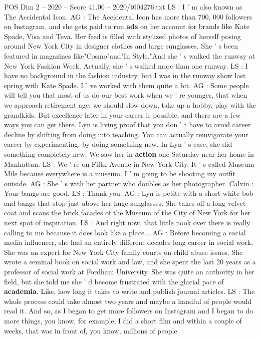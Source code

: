 \begin{textsample}{POS Dim 2 – 2020 – Score 41.00 – 2020/t004276.txt}
LS : I ' m also known as The Accidental Icon.
AG : The Accidental Icon has more than 700, 000 followers on Instagram, and she gets paid to run \textbf{ads} on her account for brands like Kate Spade, Visa and Teva.
Her feed is filled with stylized photos of herself posing around New York City in designer clothes and large sunglasses.
She ' s been featured in magazines like"Cosmo"and"In Style."And she ' s walked the runway at New York Fashion Week.
Actually, she ' s walked more than one runway.
LS : I have no background in the fashion industry, but I was in the runway show last spring with Kate Spade.
I ' ve worked with them quite a bit.
AG : Some people will tell you that most of us do our best work when we ' re younger, that when we approach retirement age, we should slow down, take up a hobby, play with the grandkids.
But excellence later in your career is possible, and there are a few ways you can get there.
Lyn is living proof that you don ' t have to avoid career decline by shifting from doing into teaching.
You can actually reinvigorate your career by experimenting, by doing something new.
In Lyn ' s case, she did something completely new.
We saw her in \textbf{action} one Saturday near her home in Manhattan.
LS : We ' re on Fifth Avenue in New York City.
It ' s called Museum Mile because everywhere is a museum.
I ' m going to be shooting my outfit outside.
AG : She ' s with her partner who doubles as her photographer.
Calvin : Your bangs are good.
LS : Thank you.
AG : Lyn is petite with a short white bob and bangs that stop just above her huge sunglasses.
She takes off a long velvet coat and scans the brick facades of the Museum of the City of New York for her next spot of inspiration.
LS : And right now, that little nook over there is really calling to me because it does look like a place...
AG : Before becoming a social media influencer, she had an entirely different decades-long career in social work.
She was an expert for New York City family courts on child abuse issues.
She wrote a seminal book on social work and law, and she spent the last 20 years as a professor of social work at Fordham University.
She was quite an authority in her field, but she told me she ' d become frustrated with the glacial pace of \textbf{academia}.
Like, how long it takes to write and publish journal articles.
LS : The whole process could take almost two years and maybe a handful of people would read it.
And so, as I began to get more followers on Instagram and I began to do more things, you know, for example, I did a short film and within a couple of weeks, that was in front of, you know, millions of people.

\end{textsample}
